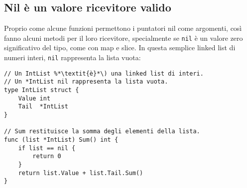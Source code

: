 \subsection{Nil è un valore ricevitore valido}
\label{subsec:nil_e_un_valore_ricevitore_valido}%
Proprio come alcune funzioni permettono i puntatori nil come argomenti, così fanno alcuni metodi per il loro ricevitore, specialmente se \verb|nil| è un valore zero significativo del tipo, come con map e slice.
In questa semplice linked list di numeri interi, \verb|nil| rappresenta la lista vuota:
\begin{lstlisting}[frame=single, label={lst:lstlisting5-2.8}]
// Un IntList %*\textit{è}*\) una linked list di interi.
// Un *IntList nil rappresenta la lista vuota.
type IntList struct {
    Value int
    Tail  *IntList
}

// Sum restituisce la somma degli elementi della lista.
func (list *IntList) Sum() int {
    if list == nil {
        return 0
    }
    return list.Value + list.Tail.Sum()
}
\end{lstlisting}